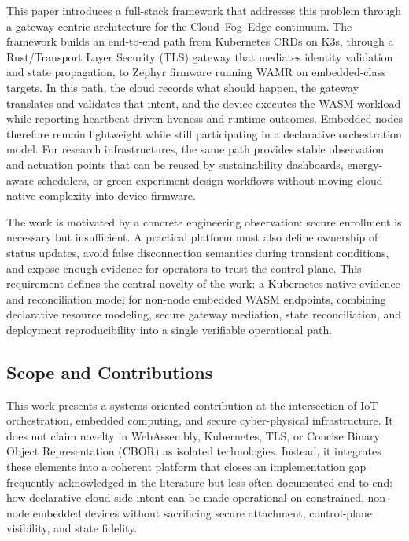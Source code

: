 This paper introduces a full-stack framework that addresses this problem through a gateway-centric architecture for the Cloud--Fog--Edge continuum. The framework builds an end-to-end path from Kubernetes CRDs on K3s, through a Rust/Transport Layer Security (TLS) gateway that mediates identity validation and state propagation, to Zephyr firmware running WAMR on embedded-class targets. In this path, the cloud records what should happen, the gateway translates and validates that intent, and the device executes the WASM workload while reporting heartbeat-driven liveness and runtime outcomes. Embedded nodes therefore remain lightweight while still participating in a declarative orchestration model. For research infrastructures, the same path provides stable observation and actuation points that can be reused by sustainability dashboards, energy-aware schedulers, or green experiment-design workflows without moving cloud-native complexity into device firmware.

The work is motivated by a concrete engineering observation: secure enrollment is necessary but insufficient. A practical platform must also define ownership of status updates, avoid false disconnection semantics during transient conditions, and expose enough evidence for operators to trust the control plane. This requirement defines the central novelty of the work: a Kubernetes-native evidence and reconciliation model for non-node embedded WASM endpoints, combining declarative resource modeling, secure gateway mediation, state reconciliation, and deployment reproducibility into a single verifiable operational path.

\subsection{Scope and Contributions}
This work presents a systems-oriented contribution at the intersection of IoT orchestration, embedded computing, and secure cyber-physical infrastructure. It does not claim novelty in WebAssembly, Kubernetes, TLS, or Concise Binary Object Representation (CBOR) as isolated technologies. Instead, it integrates these elements into a coherent platform that closes an implementation gap frequently acknowledged in the literature but less often documented end to end: how declarative cloud-side intent can be made operational on constrained, non-node embedded devices without sacrificing secure attachment, control-plane visibility, and state fidelity.


